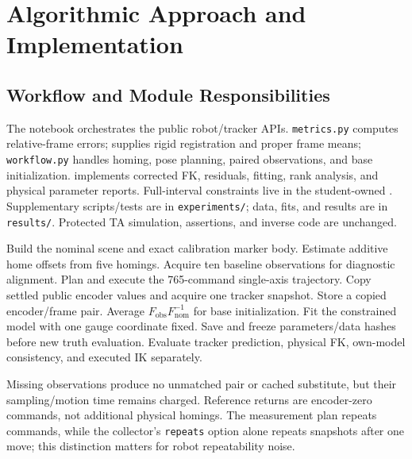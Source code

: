 \documentclass[11pt,letterpaper]{article}
\begin{document}
\section{Algorithmic Approach and Implementation}\label{sec:implementation}
\subsection{Workflow and Module Responsibilities}
The notebook orchestrates the public robot/tracker APIs. \texttt{metrics.py} computes relative-frame errors;  supplies rigid registration and proper frame means; \texttt{workflow.py} handles homing, pose planning, paired observations, and base initialization.  implements corrected FK, residuals, fitting, rank analysis, and physical parameter reports. Full-interval constraints live in the student-owned . Supplementary scripts/tests are in \texttt{experiments/}; data, fits, and results are in \texttt{results/}. Protected TA simulation, assertions, and inverse code are unchanged.

\begin{algorithm}[!htbp]
\caption{Calibration and frozen-model evaluation}\label{alg:acquisition}
\begin{algorithmic}[1]
\State Build the nominal scene and exact calibration marker body.
\State Estimate additive home offsets from five homings.
\State Acquire ten baseline observations for diagnostic alignment.
\State Plan and execute the 765-command single-axis trajectory.
 \State Copy settled public encoder values and acquire one tracker snapshot.
  \State Store a copied encoder/frame pair.
 \EndIf
\EndFor
\State Average $F_{\mathrm{obs}}F_{\mathrm{nom}}^{-1}$ for base initialization.
\State Fit the constrained model with one gauge coordinate fixed.
\State Save and freeze parameters/data hashes before new truth evaluation.
\State Evaluate tracker prediction, physical FK, own-model consistency, and executed IK separately.
\end{algorithmic}
\end{algorithm}

Missing observations produce no unmatched pair or cached substitute, but their sampling/motion time remains charged. Reference returns are encoder-zero commands, not additional physical homings. The measurement plan repeats commands, while the collector's \texttt{repeats} option alone repeats snapshots after one move; this distinction matters for robot repeatability noise.
\end{document}

